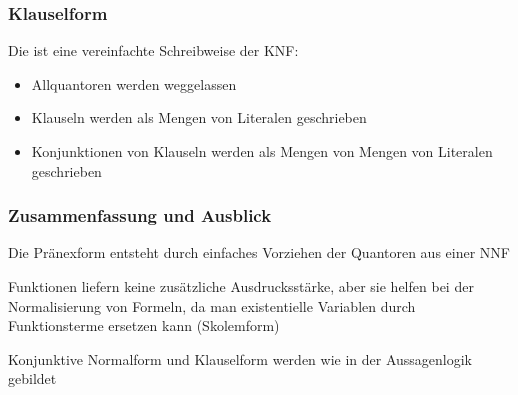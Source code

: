\documentclass[aspectratio=1610,onlymath]{beamer}
\begin{document}
\begin{frame}\frametitle{Klauselform}

Die  ist eine vereinfachte Schreibweise der KNF:
\begin{itemize}
\item Allquantoren werden weggelassen
\item Klauseln werden als Mengen von Literalen geschrieben
\item Konjunktionen von Klauseln werden als Mengen von Mengen von Literalen geschrieben
\end{itemize}


\end{frame}






\begin{frame}\frametitle{Zusammenfassung und Ausblick}

Die Pränexform entsteht durch einfaches Vorziehen der Quantoren aus einer NNF\bigskip

Funktionen liefern keine zusätzliche Ausdrucksstärke, aber sie helfen bei der
Normalisierung von Formeln, da man existentielle Variablen durch Funktionsterme ersetzen kann (Skolemform)
\bigskip

Konjunktive Normalform und Klauselform werden wie in der Aussagenlogik gebildet
\bigskip


\end{frame}
\end{document}
